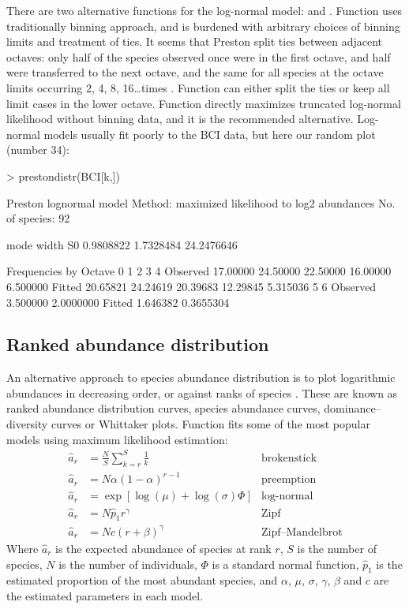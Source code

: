 \documentclass[a4paper,10pt,twocolumn]{article}
\begin{document}
There are two alternative functions for the log-normal model:
 and .  Function 
uses traditionally binning approach, and is burdened with arbitrary
choices of binning limits and treatment of ties. It seems that Preston
split ties between adjacent octaves: only half of the species observed
once were in the first octave, and half were transferred to the next
octave, and the same for all species at the octave limits occurring 2,
4, 8, 16\ldots times \citep{WilliamsonGaston05}. Function
 can either split the ties or keep all limit cases in
the lower octave.  Function  directly maximizes
truncated log-normal likelihood without binning data, and it is the
recommended alternative.  Log-normal models usually fit poorly to the
BCI data, but here our random plot (number 34):
\begin{Schunk}
\begin{Sinput}
> prestondistr(BCI[k,])
\end{Sinput}
\begin{Soutput}
Preston lognormal model
Method: maximized likelihood to log2 abundances 
No. of species: 92 

      mode      width         S0 
 0.9808822  1.7328484 24.2476646 

Frequencies by Octave
                0        1        2        3        4
Observed 17.00000 24.50000 22.50000 16.00000 6.500000
Fitted   20.65821 24.24619 20.39683 12.29845 5.315036
                5         6
Observed 3.500000 2.0000000
Fitted   1.646382 0.3655304
\end{Soutput}
\end{Schunk}

\subsection{Ranked abundance distribution}

An alternative approach to species abundance distribution is to plot
logarithmic abundances in decreasing order, or against ranks of
species \citep{Whittaker65}.  These are known as ranked abundance
distribution curves, species abundance curves, dominance--diversity
curves or Whittaker plots.  Function  fits some of the
most popular models \citep{Bastow91} using maximum likelihood
estimation:
\begin{align}
\hat a_r &= \frac{N}{S} \sum_{k=r}^S \frac{1}{k} &\text{brokenstick}\\
\hat a_r &= N \alpha (1-\alpha)^{r-1} & \text{preemption} \\
\hat a_r &= \exp \left[\log (\mu) + \log (\sigma) \Phi \right]
&\text{log-normal}\\
\hat a_r &= N \hat p_1 r^\gamma &\text{Zipf}\\
\hat a_r &= N c (r + \beta)^\gamma &\text{Zipf--Mandelbrot}
\end{align}
Where $\hat a_r$ is the expected abundance of species at rank $r$, $S$
is the number of species, $N$ is the number of individuals, $\Phi$ is
a standard normal function, $\hat p_1$ is the estimated proportion of
the most abundant species, and $\alpha$, $\mu$, $\sigma$, $\gamma$,
$\beta$ and $c$ are the estimated parameters in each model.
\end{document}
